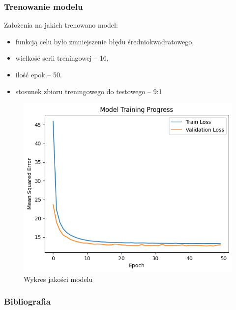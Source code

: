 \documentclass[usepdftitle=false,24pt]{beamer}
\begin{document}
\begin{frame}
    \frametitle{Trenowanie modelu}

    Założenia na jakich trenowano model:
    \begin{itemize}
        \item funkcją celu było zmniejszenie błędu średniokwadratowego,
        \item wielkość serii treningowej -- 16,
        \item ilość epok -- 50.
        \item stosunek zbioru treningowego do testowego -- 9:1
    \end{itemize}


    \begin{figure}
        \includegraphics[width=.6\textwidth]{images/TestVsValidation.png}
        \caption{Wykres jakości modelu}
    \end{figure}


\end{frame}

\begin{frame}[allowframebreaks]
    \frametitle{Bibliografia}
    
    

\end{frame}
\end{document}
